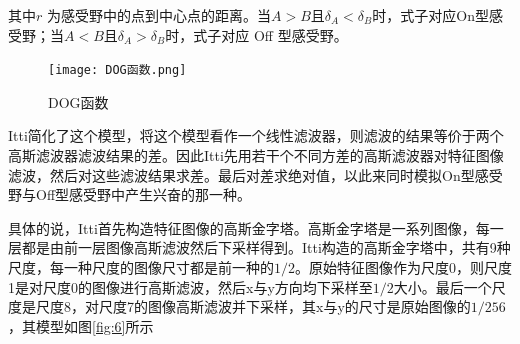 \documentclass[a4paper,10pt]{article}\large
\begin{document}
其中$r$ 为感受野中的点到中心点的距离。当$A>B$且$\delta_{A}<\delta_{B}$时，式子对应On型感受野；当$A<B$且$\delta_{A}>\delta_{B}$时，式子对应 Off 型感受野。
\begin{figure}[!htb]
\centering
\texttt{[image: DOG函数.png]}
\caption{DOG函数}\label{fig:5} 
\end{figure}

Itti简化了这个模型，将这个模型看作一个线性滤波器，则滤波的结果等价于两个高斯滤波器滤波结果的差。因此Itti先用若干个不同方差的高斯滤波器对特征图像滤波，然后对这些滤波结果求差。最后对差求绝对值，以此来同时模拟On型感受野与Off型感受野中产生兴奋的那一种。


具体的说，Itti首先构造特征图像的高斯金字塔。高斯金字塔是一系列图像，每一层都是由前一层图像高斯滤波然后下采样得到。Itti构造的高斯金字塔中，共有9种尺度，每一种尺度的图像尺寸都是前一种的$1/2$。原始特征图像作为尺度0，则尺度1是对尺度0的图像进行高斯滤波，然后x与y方向均下采样至$1/2$大小。最后一个尺度是尺度8，对尺度7的图像高斯滤波并下采样，其x与y的尺寸是原始图像的$1/256$，其模型如图\ref{fig:6}所示

\end{document}
